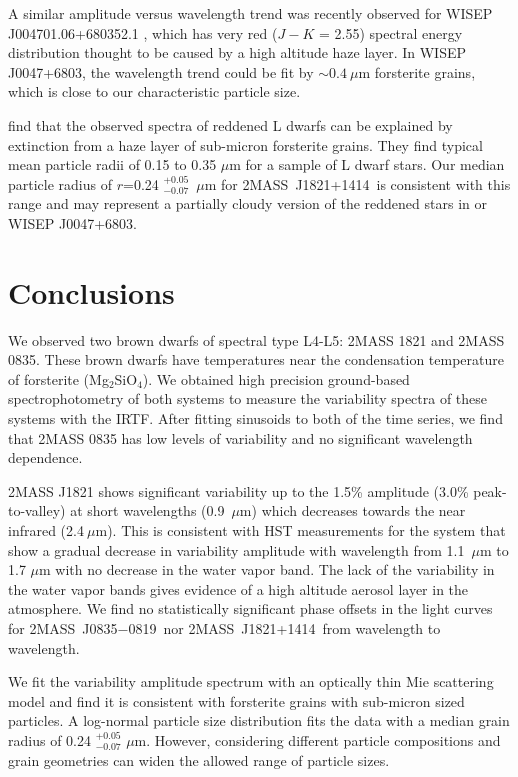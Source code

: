 \documentclass[twocolumn]{aastex6}
\newcommand{\sha}{2MASS~J0835$-$0819}
\newcommand{\shb}{2MASS~J1821+1414}
\begin{document}
A similar amplitude versus wavelength trend was recently observed for WISEP J004701.06+680352.1 \citep{2016ApJ...829L..32L}, which has very red ($J-K$ = 2.55) spectral energy distribution thought to be caused by a high altitude haze layer.
In WISEP J0047+6803, the wavelength trend could be fit by $\sim0.4~\mu$m forsterite grains, which is close to our characteristic particle size.

\citet{hiranaka2016subMicronDust} find that the observed spectra of reddened L dwarfs can be explained by extinction from a haze layer of sub-micron forsterite grains.
They find typical mean particle radii of 0.15 to 0.35 $\mu$m for a sample of L dwarf stars.
Our median particle radius of $r$=0.24 $^{+0.05}_{-0.07}$~$\mu$m for \shb\ is consistent with this range and may represent a partially cloudy version of the reddened stars in \citet{hiranaka2016subMicronDust} or WISEP J0047+6803.

\section{Conclusions}\label{sec:conclusions}

We observed two brown dwarfs of spectral type L4-L5: 2MASS 1821 and 2MASS 0835.
These brown dwarfs have temperatures near the condensation temperature of forsterite (Mg$_2$SiO$_4$).
We obtained high precision ground-based spectrophotometry of both systems to measure the variability spectra of these systems with the IRTF.
After fitting sinusoids to both of the time series, we find that 2MASS 0835 has low levels of variability and no significant wavelength dependence.

2MASS J1821 shows significant variability up to the 1.5\% amplitude (3.0\% peak-to-valley) at short wavelengths (0.9~$\mu$m) which decreases towards the near infrared (2.4$~\mu$m).
This is consistent with HST measurements for the system that show a gradual decrease in variability amplitude with wavelength \citep{2016ApJ...826....8Y} from 1.1~$\mu$m to 1.7 $\mu$m with no decrease in the water vapor band.
The lack of the variability in the water vapor bands gives evidence of a high altitude aerosol layer in the atmosphere.
We find no statistically significant phase offsets in the light curves for \sha\ nor \shb\ from wavelength to wavelength.
 
We fit the variability amplitude spectrum with an optically thin Mie scattering model and find it is consistent with forsterite grains with sub-micron sized particles.
A log-normal particle size distribution fits the data with a median grain radius of 0.24 $^{+0.05}_{-0.07}$ $\mu$m.
However, considering different particle compositions and grain geometries can widen the allowed range of particle sizes.
\end{document}
